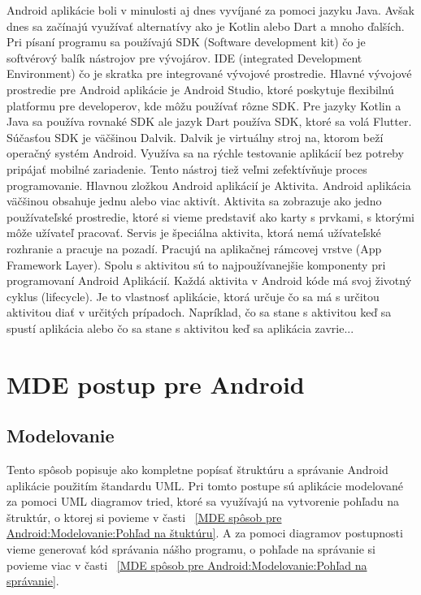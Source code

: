 \documentclass[10pt,twoside,slovak,a4paper]{article}
\begin{document}
Android aplikácie boli v minulosti aj dnes vyvíjané za pomoci jazyku Java. Avšak dnes sa začínajú využívať alternatívy ako je Kotlin alebo Dart a mnoho ďalších. Pri písaní programu sa používajú SDK (Software development kit) čo je softvérový balík nástrojov pre vývojárov. IDE (integrated Development Environment) čo je skratka pre integrované vývojové prostredie. \newline
Hlavné vývojové prostredie pre Android aplikácie je Android Studio, ktoré poskytuje flexibilnú platformu pre developerov, kde môžu používať rôzne SDK. Pre jazyky Kotlin a Java sa používa rovnaké SDK ale jazyk Dart používa SDK, ktoré sa volá Flutter. \newline
Súčasťou SDK je väčšinou Dalvik. Dalvik je virtuálny stroj na, ktorom beží operačný systém Android. Využíva sa na rýchle testovanie aplikácií bez potreby pripájať mobilné zariadenie. Tento nástroj tiež veľmi zefektívňuje proces programovanie.\newline
Hlavnou zložkou Android aplikácií je Aktivita. Android aplikácia väčšinou obsahuje jednu alebo viac aktivít. Aktivita sa zobrazuje ako jedno používateľské prostredie, ktoré si vieme predstaviť ako karty s prvkami, s ktorými môže užívateľ pracovať.\newline
Servis je špeciálna aktivita, ktorá nemá užívateľské rozhranie a pracuje na pozadí. Pracujú na aplikačnej rámcovej vrstve (App Framework Layer). Spolu s aktivitou sú to najpoužívanejšie komponenty pri programovaní Android Aplikácií. \newline
Každá aktivita v Android kóde má svoj životný cyklus (lifecycle). Je to vlastnosť aplikácie, ktorá určuje čo sa má s určitou aktivitou diať v určitých prípadoch. Napríklad, čo sa stane s aktivitou keď sa spustí aplikácia alebo čo sa stane s aktivitou keď sa aplikácia zavrie... \cite{VývojAndroid}








\section{MDE postup pre Android} \label{MDE spôsob pre Android}

\subsection{Modelovanie}\label{MDE spôsob pre Android:Modelovanie}
Tento spôsob popisuje ako kompletne popísať štruktúru a správanie Android aplikácie použitím štandardu UML. \newline
Pri tomto postupe sú aplikácie modelované za pomoci UML diagramov tried, ktoré sa využívajú na vytvorenie pohľadu na štruktúr, o ktorej si povieme v časti ~\ref{MDE spôsob pre Android:Modelovanie:Pohľad na štuktúru}. A za pomoci diagramov postupnosti vieme generovať kód správania nášho programu, o pohľade na správanie si povieme viac v časti ~\ref{MDE spôsob pre Android:Modelovanie:Pohľad na správanie}. \cite{GenerovanieAndroid}
\end{document}
